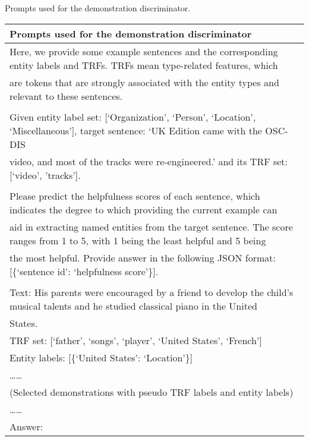 \begin{prompt*}[t]
	\centering
	\caption{Prompts used for the demonstration discriminator.}
	\label{tab:discriminator-chapter5}
	\begin{tabular}{l}
		\toprule
        Prompts used for the demonstration discriminator \\
        \midrule
        Here, we provide some example sentences and the corresponding entity labels and TRFs.
        TRFs mean type-related features,  which \\ are tokens that are strongly associated with the entity types and relevant to these sentences. 
        \\ \\
        Given entity label set: {[}`Organization', `Person', `Location', `Miscellaneous'{]}, target sentence: `UK Edition came with the OSC-DIS \\ video, and most of the tracks were re-engineered.' and its TRF set:[`video', 'tracks'].\\
        \\ Please predict the helpfulness scores of each sentence, which indicates the degree to which providing the current example can \\ aid in extracting named entities from the target sentence. The score ranges from 1 to 5, with 1 being the least helpful and 5 being \\ the most helpful. Provide answer in the following JSON format: {[}\{`sentence id': `helpfulness score'\}{]}.
        \\
        \\
        Text: His parents were encouraged by a friend to develop the child's musical talents and he studied classical piano in the United \\ States.\\
        TRF set: [`father', `songs', `player', `United States', `French']\\
        Entity labels: [\{`United States': `Location'\}]\\
        \ldots\ldots\\
        (Selected demonstrations with pseudo TRF labels and entity labels)\\
        \ldots\ldots\\
        Answer: 
        \\
        \bottomrule
	\end{tabular}
\end{prompt*}

